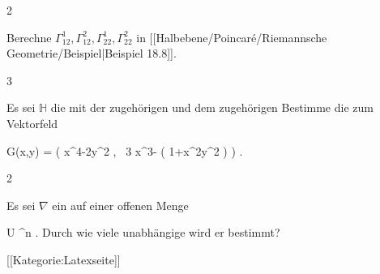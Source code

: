 {2}
{

Berechne $\Gamma^1_{12},  \Gamma^2_{12},  \Gamma^1_{22},  \Gamma^2_{22}$ in
[[Halbebene/Poincaré/Riemannsche Geometrie/Beispiel|Beispiel 18.8]].

}
{} {}

{3}
{

Es sei ${\mathbb H}$ die
mit der zugehörigen
und dem zugehörigen
Bestimme die
 zum Vektorfeld

\mavergleichskettedisp
{\vergleichskette
{ G(x,y)
}
{ =} { \left(  x^4-2y^2  , \,   3 x^3-  \ln  \left(  1+x^2y^2 \right)                   \right)
}
{ } {
}
{ } {
}
{ } {
}
}
{}{}{.}

}
{} {}

{2}
{

Es sei $\nabla$ ein
auf einer offenen Menge

\mavergleichskette
{\vergleichskette
{ U
}
{ \subseteq }{ \R^n
}
{  }{
}
{    }{
}
{   }{
}
}
{}{}{.}
Durch wie viele unabhängige
wird er
 {} {}
bestimmt?

}
{} {}

 [[Kategorie:Latexseite]]
